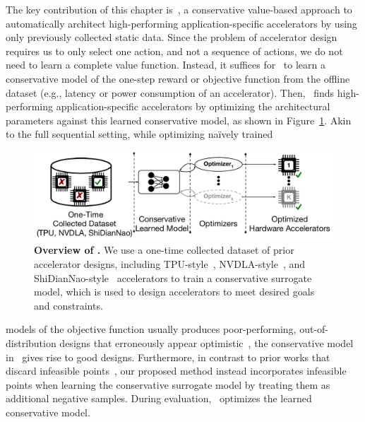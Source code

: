 The key contribution of this chapter is \primemethodname\,, a conservative value-based approach to automatically architect high-performing application-specific accelerators by using only previously collected static data. Since the problem of accelerator design requires us to only select one action, and not a sequence of actions, we do not need to learn a complete value function. Instead, it suffices for \primemethodname\ to learn a conservative model of the one-step reward or objective function from the offline dataset (e.g., latency or power consumption of an accelerator).
Then, \primemethodname\ finds high-performing application-specific accelerators by optimizing the architectural parameters against this learned conservative model, as shown in Figure~\ref{fig:overview}. Akin to the full sequential setting, while optimizing na\"ively trained
\begin{figure}[t!]
    \centering
    \vspace{-0.1cm}
    \includegraphics[width=0.8\linewidth]{chapters/prime/figs/overview/prime-overview.pdf}
    \vspace{-0.2cm}
    \caption{\footnotesize{\textbf{Overview of \primemethodname.} We use a one-time collected dataset of prior accelerator designs, including TPU-style~\citep{yazdanbakhsh2021evaluation}, NVDLA-style~\citep{nvdla}, and ShiDianNao-style~\citep{shidiannao} accelerators to train a conservative surrogate model, which is used to design accelerators to meet desired goals and constraints.}}
    \vspace{-0.4cm}
    \label{fig:overview}
\end{figure}
models of the objective function usually produces poor-performing, out-of-distribution designs that erroneously appear optimistic~\citep{kumar2019model,brookes19a,trabucco2021conservative},
the conservative model in \primemethodname\ gives rise to good designs. Furthermore, in contrast to prior works that discard infeasible points~\citep{hegdemind,trabucco2021conservative}, our proposed method instead incorporates infeasible points when learning the conservative surrogate model by treating them as additional negative samples. During evaluation, \primemethodname\ optimizes the learned conservative model.

